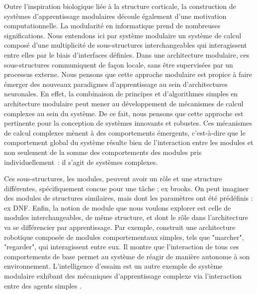 Outre l'inspiration biologique liée à la structure corticale, la construction de systèmes d'apprentissage modulaires découle également d'une motivation computationnelle.
La modularité en informatique prend de nombreuses significations.
Nous entendons ici par système modulaire un système de calcul composé d'une multiplicité de sous-structures interchangeables qui interagissent entre elles par le biais d'interfaces définies. 
Dans une architecture modulaire, ces sous-structures communiquent de façon locale, sans être supervisées par un processus externe.
Nous pensons que cette approche modulaire est propice à faire émerger des nouveaux paradigmes d'apprentissage au sein d'architectures neuronales. 
En effet, la combinaison de principes et d'algorithmes simples en architecture modulaire peut mener au développement de mécanismes de calcul complexes au sein du système. De ce fait, nous pensons que cette approche est pertinente pour la conception de systèmes innovants et robustes.
Ces mécanismes de calcul complexes mènent à des comportements émergents, c'est-à-dire que le comportement global du système résulte bien de l'interaction entre les modules et non seulement de la somme des comportements des modules pris individuellement~: il s'agit de systèmes complexes.

Ces sous-structures, les modules, peuvent avoir un rôle et une structure différentes, spécifiquement concue pour une tâche ; ex brooks. 
On peut imaginer des modules de structures similaires, mais dont les paramètres ont été prédéfinis : ex DNF. Enfin, la notion de module que nous voulons explorer est celle de modules interchangeables, de même structure, et dont le rôle dans l'architecture va se différencier par apprentissage.
Par exemple, \cite{brooks_sumsumption_85} construit une architecture robotique composée de modules comportementaux simples, tels que "marcher", "regarder", qui interagissent entre eux. Il montre que l'interaction de tous ces comportements de base permet au système de réagir de manière autonome à son environnement. L'intelligence d'essaim est un autre exemple de système modulaire exhibant des mécaniques d'apprentissage complexe via l'interaction entre des agents simples \parencite{Bonabeau1999SwarmI}.

